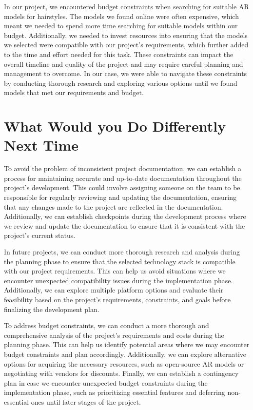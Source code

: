 \documentclass{article}
\begin{document}
In our project, we encountered budget constraints when searching for suitable AR models for hairstyles. The models we found online were often expensive, which meant we needed to spend more time searching for suitable models within our budget. Additionally, we needed to invest resources into ensuring that the models we selected were compatible with our project's requirements, which further added to the time and effort needed for this task. These constraints can impact the overall timeline and quality of the project and may require careful planning and management to overcome. In our case, we were able to navigate these constraints by conducting thorough research and exploring various options until we found models that met our requirements and budget.

\section{What Would you Do Differently Next Time}
To avoid the problem of inconsistent project documentation, we can establish a process for maintaining accurate and up-to-date documentation throughout the project's development. This could involve assigning someone on the team to be responsible for regularly reviewing and updating the documentation, ensuring that any changes made to the project are reflected in the documentation. Additionally, we can establish checkpoints during the development process where we review and update the documentation to ensure that it is consistent with the project's current status.

In future projects, we can conduct more thorough research and analysis during the planning phase to ensure that the selected technology stack is compatible with our project requirements. This can help us avoid situations where we encounter unexpected compatibility issues during the implementation phase. Additionally, we can explore multiple platform options and evaluate their feasibility based on the project's requirements, constraints, and goals before finalizing the development plan.

To address budget constraints, we can conduct a more thorough and comprehensive analysis of the project's requirements and costs during the planning phase. This can help us identify potential areas where we may encounter budget constraints and plan accordingly. Additionally, we can explore alternative options for acquiring the necessary resources, such as open-source AR models or negotiating with vendors for discounts. Finally, we can establish a contingency plan in case we encounter unexpected budget constraints during the implementation phase, such as prioritizing essential features and deferring non-essential ones until later stages of the project.
\end{document}
